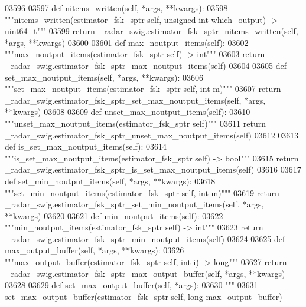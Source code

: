 \begin{DoxyCode}
{{{{{{{{{{{{{03596 
03597     \textcolor{keyword}{def }nitems_written(self, *args, **kwargs):
03598         \textcolor{stringliteral}{"""nitems\_written(estimator\_fsk\_sptr self, unsigned int which\_output) -> uint64\_t"""}
03599         \textcolor{keywordflow}{return} \_radar\_swig.estimator\_fsk\_sptr\_nitems\_written(self, *args, **kwargs)
03600 
03601     \textcolor{keyword}{def }max_noutput_items(self):
03602         \textcolor{stringliteral}{"""max\_noutput\_items(estimator\_fsk\_sptr self) -> int"""}
03603         \textcolor{keywordflow}{return} \_radar\_swig.estimator\_fsk\_sptr\_max\_noutput\_items(self)
03604 
03605     \textcolor{keyword}{def }set_max_noutput_items(self, *args, **kwargs):
03606         \textcolor{stringliteral}{"""set\_max\_noutput\_items(estimator\_fsk\_sptr self, int m)"""}
03607         \textcolor{keywordflow}{return} \_radar\_swig.estimator\_fsk\_sptr\_set\_max\_noutput\_items(self, *args, **kwargs)
03608 
03609     \textcolor{keyword}{def }unset_max_noutput_items(self):
03610         \textcolor{stringliteral}{"""unset\_max\_noutput\_items(estimator\_fsk\_sptr self)"""}
03611         \textcolor{keywordflow}{return} \_radar\_swig.estimator\_fsk\_sptr\_unset\_max\_noutput\_items(self)
03612 
03613     \textcolor{keyword}{def }is_set_max_noutput_items(self):
03614         \textcolor{stringliteral}{"""is\_set\_max\_noutput\_items(estimator\_fsk\_sptr self) -> bool"""}
03615         \textcolor{keywordflow}{return} \_radar\_swig.estimator\_fsk\_sptr\_is\_set\_max\_noutput\_items(self)
03616 
03617     \textcolor{keyword}{def }set_min_noutput_items(self, *args, **kwargs):
03618         \textcolor{stringliteral}{"""set\_min\_noutput\_items(estimator\_fsk\_sptr self, int m)"""}
03619         \textcolor{keywordflow}{return} \_radar\_swig.estimator\_fsk\_sptr\_set\_min\_noutput\_items(self, *args, **kwargs)
03620 
03621     \textcolor{keyword}{def }min_noutput_items(self):
03622         \textcolor{stringliteral}{"""min\_noutput\_items(estimator\_fsk\_sptr self) -> int"""}
03623         \textcolor{keywordflow}{return} \_radar\_swig.estimator\_fsk\_sptr\_min\_noutput\_items(self)
03624 
03625     \textcolor{keyword}{def }max_output_buffer(self, *args, **kwargs):
03626         \textcolor{stringliteral}{"""max\_output\_buffer(estimator\_fsk\_sptr self, int i) -> long"""}
03627         \textcolor{keywordflow}{return} \_radar\_swig.estimator\_fsk\_sptr\_max\_output\_buffer(self, *args, **kwargs)
03628 
03629     \textcolor{keyword}{def }set_max_output_buffer(self, *args):
03630         \textcolor{stringliteral}{"""}
03631 \textcolor{stringliteral}{        set\_max\_output\_buffer(estimator\_fsk\_sptr self, long max\_output\_buffer)}
}}}}}}}}}}}}}
\end{DoxyCode}
